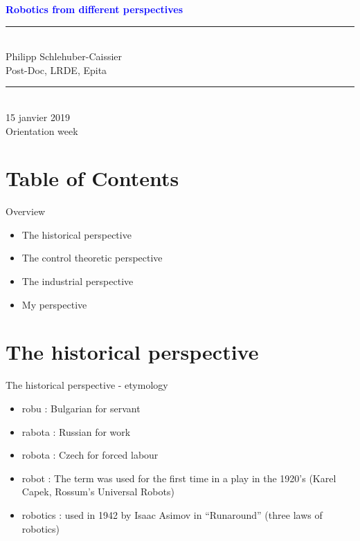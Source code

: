 \documentclass[usenames,dvipsnames,xcolor=table]{beamer}
\date{\today} %
\begin{document}
\begin{frame}
\begin{center}
    \textcolor{blue}{
    \textbf{
    {\Large
    Robotics from different perspectives\\[4pt]
    }}
    }
    \rule{.9\linewidth}{2pt}\\[4pt]
    Philipp Schlehuber-Caissier \\
    Post-Doc, LRDE, Epita\\[6pt]
    \rule{.9\linewidth}{2pt}\\[4pt]
 	15 janvier 2019\\
    Orientation week
    
\end{center}
\end{frame}


\section{Table of Contents}

\begin{frame}{Overview}
    \begin{itemize}
        \item The historical perspective
        \item The control theoretic perspective
        \item The industrial perspective
        \item My perspective
    \end{itemize}
\end{frame}

\section{The historical perspective}
\begin{frame}{The historical perspective - etymology}
\begin{center}

\begin{itemize}
\item robu : Bulgarian for servant
\item rabota : Russian for work
\item robota : Czech for forced labour
\item robot : The term was used for the first time in a play in the 1920's (Karel Capek, Rossum's Universal Robots)
\item robotics : used in 1942 by Isaac Asimov in ``Runaround'' (three laws of robotics)
\end{itemize}
\end{center}
\end{frame}
\end{document}
